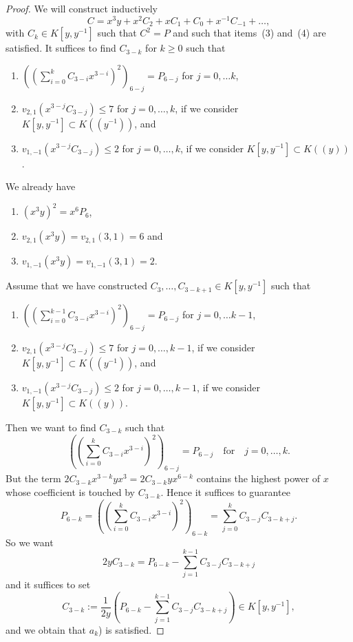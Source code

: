 \documentclass[reqno,a4paper,twoside]{amsart}
\theoremstyle{definition}
\theoremstyle{remark}
\begin{document}
\begin{proof}
We will construct inductively
$$
C=x^3 y +x^2 C_2+x C_1 +C_0+ x^{-1}C_{-1}+\dots,
$$
with $C_k\in K[y,y^{-1}]$ such that $C^2=P$ and such that items~(3) and~(4) are satisfied. It suffices to find $C_{3-k}$ for $k\ge 0$ such that
\begin{enumerate}
  \item[$a_k$)] $\left(\left(\sum_{i=0}^{k} C_{3-i}x^{3-i}\right)^2\right)_{6-j}=P_{6-j}$ for $j=0,\dots k$,
  \item[$b_k$)] $v_{2,1}(x^{3-j} C_{3-j})\le 7$ for $j=0,\dots, k$, if we consider $K[y,y^{-1}]\subset K((y^{-1}))$, and
  \item[$c_k$)] $v_{1,-1}(x^{3-j} C_{3-j})\le 2$ for $j=0,\dots, k$, if we consider $K[y,y^{-1}]\subset K((y))$.
\end{enumerate}

We already have
\begin{enumerate}
  \item[$a_0$)] $(x^3 y)^2=x^6 P_6$,
  \item[$b_0$)] $v_{2,1}(x^3 y)=v_{2,1}(3,1)=6$ and
  \item[$c_0$)] $v_{1,-1}(x^3 y)=v_{1,-1}(3,1)=2$.
\end{enumerate}
 Assume that we have constructed $C_3,\dots,C_{3-k+1}\in K[y,y^{-1}]$ such that
\begin{enumerate}
  \item[$a_{k-1}$)] $\left(\left(\sum_{i=0}^{k-1} C_{3-i}x^{3-i}\right)^2\right)_{6-j}=P_{6-j}$ for $j=0,\dots k-1$,
  \item[$b_{k-1}$)] $v_{2,1}(x^{3-j} C_{3-j})\le 7$  for $j=0,\dots, k-1$, if we consider $K[y,y^{-1}]\subset K((y^{-1}))$, and
  \item[$c_{k-1}$)] $v_{1,-1}(x^{3-j} C_{3-j})\le 2$  for $j=0,\dots, k-1$, if we consider $K[y,y^{-1}]\subset K((y))$.
\end{enumerate}
Then we want to find $C_{3-k}$ such that
$$
\left(\left(\sum_{i=0}^{k} C_{3-i}x^{3-i}\right)^2\right)_{6-j}=P_{6-j}\quad\text{for}\quad j=0,\dots, k.
$$
But the term $2C_{3-k}x^{3-k} y x^3=2C_{3-k} y x^{6-k}$ contains the highest power of $x$ whose coefficient
is touched by $C_{3-k}$. Hence it suffices to guarantee
$$
P_{6-k}=\left(\left(\sum_{i=0}^{k} C_{3-i}x^{3-i}\right)^2\right)_{6-k}=\sum_{j=0}^{k}C_{3-j}C_{3-k+j}.
$$
So we want
$$
2y C_{3-k}=P_{6-k}-\sum_{j=1}^{k-1}C_{3-j}C_{3-k+j}
$$
and it suffices to set
\begin{equation}\label{ecuacion de C 3-k para 7}
C_{3-k}:=\frac{1}{2 y}\left( P_{6-k}-\sum_{j=1}^{k-1}C_{3-j}C_{3-k+j}\right)\in K[y,y^{-1}],
\end{equation}
and we obtain that $a_k$) is satisfied.


\end{proof}
\end{document}
